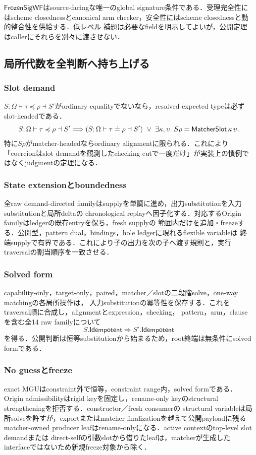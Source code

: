 $\mathsf{FrozenSigWF}$はsource-facingな唯一のglobal signature条件である．受理完全性にはscheme
closednessとcanonical arm checker，安全性にはscheme closednessと動的整合性を供給する．低レベル
補題は必要なfieldを明示してよいが，公開定理はcallerにそれらを別々に渡させない．

\subsection{局所代数を全判断へ持ち上げる}

\subsubsection*{Slot demand}
$S;\Omega\vdash\tau\preccurlyeq\rho\dashv S'$がordinary equalityでないなら，resolved expected
typeは必ずslot-headedである．
\[
S;\Omega\vdash\tau\preccurlyeq\rho\dashv S'
\Longrightarrow
(S;\Omega\vdash\tau\doteq\rho\dashv S')
\ \lor\
\exists\kappa,\upsilon.\;S\rho=\mathsf{MatcherSlot}\,\kappa\,\upsilon.
\]
特に$S\rho$がmatcher-headedならordinary alignmentに限られる．これにより「coercionはslot
demandを観測したchecking cutで一度だけ」が実装上の慣例ではなくjudgmentの定理になる．

\subsubsection*{State extensionとboundedness}
全raw demand-directed familyはsupplyを単調に進め，出力substitutionを入力substitutionと局所deltaの
chronological replayへ因子化する．対応するOrigin familyはledgerの既存entryを保ち，fresh supplyの
範囲内だけを追加・freezeする．公開型，pattern dual，bindings，hole ledgerに現れるflexible variableは
終端supplyで有界である．これにより子の出力を次の子へ渡す規則と，実行traversalの割当順序を一致させる．

\subsubsection*{Solved form}
capability-only，target-only，paired，matcher／slotの二段階solve，one-way matchingの各局所操作は，
入力substitutionの冪等性を保存する．これをtraversal順に合成し，alignmentとexpression，checking，
pattern，arm，clauseを含む全14 raw familyについて
\[
S.\mathsf{Idempotent}\Longrightarrow S'.\mathsf{Idempotent}
\]
を得る．公開判断は恒等substitutionから始まるため，root終端は無条件にsolved formである．

\subsubsection*{No guessとfreeze}
exact MGUはconstraint外で恒等，constraint range内，solved formである．Origin admissibilityはrigid
keyを固定し，rename-only keyのstructural strengtheningを拒否する．constructor／fresh consumerの
structural variableは局所solveを許すが，exportまたはmatcher finalizationを越えて公開payloadに残る
matcher-owned producer leafはrename-onlyになる．active contextのtop-level slot demandまたは
direct-selfの引数slotから借りたleafは，matcherが生成したinterfaceではないため新規freeze対象から除く．

